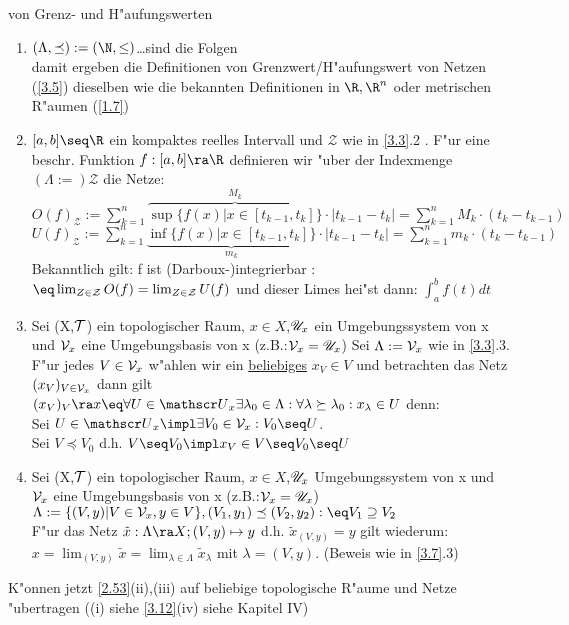 \begin{beispiel}\label{3.7} von Grenz- und H"aufungswerten
\begin{enumerate}
\item $(\Lambda , \preceq ):=(\N ,\leq )$\dots sind die Folgen\\
damit ergeben die Definitionen von Grenzwert/H"aufungswert von Netzen (\ref{3.5}) dieselben wie die bekannten Definitionen in $\R , \R^n$ oder metrischen R"aumen (\ref{1.7})
\item $[a,b]\seq\R$ ein kompaktes reelles Intervall und ${\mathcal Z}$ wie in \ref{3.3}.2 . F"ur eine beschr. Funktion $f:[a,b]\ra\R$ definieren wir "uber der Indexmenge $(\Lambda :=){\mathcal Z}$ die Netze:\vspace*{-0.3cm}\\
$O(f)_{\mathcal Z} :=\sum_{k=1}^n \overbrace{\sup\{ f(x)|x\in [t_{k-1},t_k]\}}^{M_k}\cdot |t_{k-1}-t_k|=\sum_{k=1}^n M_k\cdot (t_k-t_{k-1})$\\
$U(f)_{\mathcal Z} :=\sum_{k=1}^n \underbrace{\inf\{ f(x)|x\in [t_{k-1},t_k]\}}_{m_k}\cdot |t_{k-1}-t_k|=\sum_{k=1}^n m_k\cdot (t_k-t_{k-1})$\\
Bekanntlich gilt: f ist (Darboux-)integrierbar :$\eq \lim_{Z\in{\mathcal Z}}O(f)=\lim_{Z\in{\mathcal Z}}U(f)$ und dieser Limes hei"st dann: $\int_a^b f(t) dt$
\item Sei (X,$\mathcal T$) ein topologischer Raum, $x\in X$,${\mathscr U}_{x}$ ein Umgebungssystem von x und ${\mathcal V}_{x}$ eine Umgebungsbasis von x (z.B.:${\mathcal V}_{x}={\mathscr U}_{x}$) Sei $\Lambda:={\mathcal V}_{x}$ wie in \ref{3.3}.3.\\
F"ur jedes $V\in{\mathcal V}_{x}$ w"ahlen wir ein \ul{beliebiges} $x_V\in V$ und betrachten das Netz $(x_V)_{V\in{\mathcal V}_{x}}$ dann gilt $(x_V)_V\ra x\eq\forall U\in\umg{U}{x}\exists\lambda_0\in\Lambda:\forall\lambda\succeq\lambda_0:x_\lambda\in U$ denn:\\
Sei $U\in\umg{U}{x} \impl\exists V_0 \in\umgbas{V}{x}:V_0\seq U$.\\
Sei $V\preceq V_0$ d.h. $V\seq V_0\impl x_V\in V\seq V_0\seq U$
\item Sei (X,$\mathcal T$) ein topologischer Raum, $x\in X$,${\mathscr U}_{x}$ Umgebungssystem von x und ${\mathcal V}_{x}$ eine Umgebungsbasis von x (z.B.:${\mathcal V}_{x}={\mathscr U}_{x}$)
$\Lambda :=\{ (V,y)|V\in\umgbas{V}{x} ,y\in V\}, (V_1,y_1)\preceq (V_2,y_2):\eq V_1\supseteq V_2$\\
F"ur das Netz $\tilde{x}:\Lambda\ra X;(V,y)\mapsto y$ d.h. $\tilde{x}_{(V,y)}=y$ gilt wiederum:\\
$x=\lim_{(V,y)}\tilde{x} =\lim_{\lambda\in\Lambda}\tilde{x}_\lambda$ mit $\lambda=(V,y)$. (Beweis wie in \ref{3.7}.3)
\end{enumerate}
\end{beispiel}
K"onnen jetzt \ref{2.53}(ii),(iii) auf beliebige topologische R"aume und Netze "ubertragen ((i) siehe \ref{3.12}(iv) siehe Kapitel IV)

